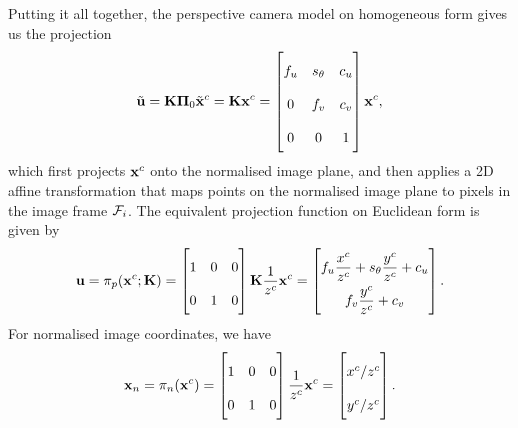 Putting it all together, the perspective camera model on homogeneous form gives us the projection
\begin{equation}
  \tilde{\vecu} = \matK \matPi_0 \tilde{\vecx}^c = \matK \vecx^c =
  \begin{bmatrix}
    f_u & s_\theta & c_u\\
    0 & f_v & c_v\\
    0 & 0 & 1
  \end{bmatrix}
  \vecx^c,
\end{equation}
which first projects ${\boldsymbol{\mathbf{x}}}^c$ onto the normalised image plane, and then applies a 2D affine transformation that maps points on the normalised image plane to pixels in the image frame $\mathcal{F}_i$.
The equivalent projection function on Euclidean form is given by
\begin{equation} \label{eq:projection-function}
  \vecu = \pi_p(\vecx^c; \matK) =
  \begin{bmatrix}
    1 & 0 & 0 \\
    0 & 1 & 0 \\
  \end{bmatrix}
  \matK \frac{1}{z^c} \vecx^c =
  \renewcommand\arraystretch{2}
  \begin{bmatrix}
    f_u \dfrac{x^c}{z^c} + s_\theta \dfrac{y^c}{z^c} + c_u\\
    f_v \dfrac{y^c}{z^c} + c_v \\
  \end{bmatrix}.
\end{equation}
For normalised image coordinates, we have
\begin{equation} \label{eq:normalised-projection-function}
  \vecx_n = \pi_n(\vecx^c) =
  \begin{bmatrix}
    1 & 0 & 0 \\
    0 & 1 & 0 \\
  \end{bmatrix}
  \frac{1}{z^c} \vecx^c =
  \begin{bmatrix}
    x^c / z^c\\
    y^c / z^c \\
  \end{bmatrix}.
\end{equation}

